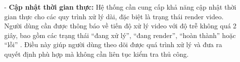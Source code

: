 \begin{itemize}
    
    \item[-] \textbf{Cập nhật thời gian thực:} Hệ thống cần cung cấp khả năng cập nhật thời gian thực cho các quy trình xử lý dài, đặc biệt là trạng thái render video. Người dùng cần được thông báo về tiến độ xử lý video với độ trễ không quá 2 giây, bao gồm các trạng thái ``đang xử lý'', ``đang render'', ``hoàn thành'' hoặc ``lỗi'' . Điều này giúp người dùng theo dõi được quá trình xử lý và đưa ra quyết định phù hợp mà không cần liên tục kiểm tra thủ công.
    
\end{itemize}